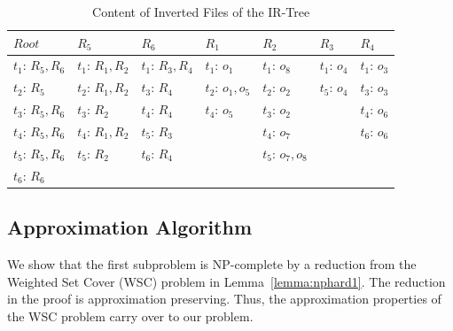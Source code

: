 \documentclass{sig-alternate}
\begin{document}
\begin{table}[!hbt]
  \centering \small
\vspace{-2pt}
  \caption{Content of Inverted Files of the IR-Tree}\label{table:InvertedList}
  \begin{tabular}{|@{ }l@{ }|@{ }l@{ }|@{ }l@{ }|@{ }l@{ }|@{ }l@{ }|@{ }l@{ }|@{ }l@{ }|}
    \hline
    $\mathit{Root}$ & $R_5$ & $R_6$ & $R_1$  & $R_2$ & $R_3$ & $R_4$\\
    \hline \hline
    $t_1$: $R_{5},R_{6}$    & $t_1$: $R_{1},R_{2}$  & $t_1$: $R_{3}, R_{4}$ & $t_1$: $o_{1}$     & $t_1$: $o_{8}$  & $t_1$: $o_{4}$ & $t_1$: $o_{3}$\\
    $t_2$: $R_{5}$    & $t_2$: $R_{1},R_{2}$ & $t_3$: $R_{4}$ & $t_2$: $o_{1},o_{5}$       & $t_2$: $o_{2}$        & $t_5$: $o_{4}$ & $t_3$: $o_{3}$\\
    $t_3$: $R_{5},R_{6}$    & $t_3$: $R_{2}$       & $t_4$: $R_{4}$ & $t_4$: $o_{5}$       & $t_3$: $o_{2}$        &                & $t_4$: $o_{6}$\\
    $t_4$: $R_{5},R_{6}$    & $t_4$: $R_{1},R_{2}$ & $t_5$: $R_{3}$ &                      & $t_4$: $o_{7}$        &                & $t_6$: $o_{6}$\\
    $t_5$: $R_{5},R_{6}$    & $t_5$: $R_{2}$       & $t_6$: $R_{4}$ &                      & $t_5$: $o_{7},o_{8}$  &                &\\
    $t_6$: $R_{6}$          &              &            &                      &                       &                &\\
    \hline
  \end{tabular}
  \vspace{-3pt}
\end{table}



\subsection{Approximation Algorithm}

We show that the first subproblem is NP-complete by a reduction
from the Weighted Set Cover (WSC) problem in Lemma~\ref{lemma:nphard1}.
The reduction in the proof is approximation preserving. Thus, the
approximation properties of the WSC problem carry over to our problem.
\end{document}
